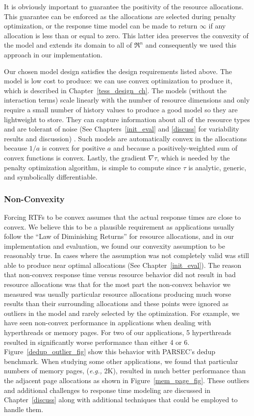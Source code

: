 It is obviously important to guarantee the positivity of the resource allocations. This guarantee can be enforced as the allocations are selected during penalty optimization, or the response time model can be made to return $\infty$ if any allocation is less than or equal to zero. This latter idea preserves the convexity of the model and extends its domain to all of $\Re^n$ and consequently we used this approach in our implementation.

Our chosen model design satisfies the design requirements listed above.  The model is low cost to produce: we can use convex optimization to produce it, which is described in Chapter~\ref{tess_design_ch}. The models (without the interaction terms) scale linearly with the number of resource dimensions and only require a small number of history values to produce a good model so they are lightweight to store.  They can capture information about all of the resource types and are tolerant of noise (See Chapters~\ref{init_eval} and \ref{discuss} for variability results and discussion) . Such models are automatically convex in the allocations because $1/a$ is convex for positive $a$ and because a positively-weighted sum of convex functions is convex.  Lastly,
the gradient $\nabla\tau$, which is needed by the penalty optimization algorithm, is simple to compute since $\tau$ is analytic, generic, and symbolically differentiable.

\subsubsection{Non-Convexity}

Forcing RTFs to be convex assumes that the actual response times are
close to convex. We believe this to be a plausible requirement as applications usually follow the ``Law of Diminishing Returns'' for resource allocations, and in our implementation and evaluation, we found our convexity assumption to be reasonably true. In cases where the assumption was not completely valid \pacora was still able to produce near optimal allocations (See Chapter~\ref{init_eval}).  The reason that non-convex response time versus resource behavior did not result in bad resource allocations was that for the most part the non-convex behavior we measured was usually particular resource allocations producing much worse results than their surrounding allocations and these points were ignored as outliers in the model and rarely selected by the optimization.  For example, we have seen non-convex performance in applications when dealing with hyperthreads or memory pages.  For two of our applications, 5 hyperthreads resulted in significantly worse performance than either 4 or 6. Figure~\ref{dedup_outlier_fig} show this behavior with PARSEC's dedup benchmark.   When studying some other applications, we found that particular numbers of memory pages, (\emph{e.g.,} 2K), resulted in much better performance than the adjacent page allocations as shown in Figure~\ref{mem_page_fig}.  These outliers and additional challenges to response time modeling are discussed in Chapter~\ref{discuss} along with additional techniques that could be employed to handle them.


